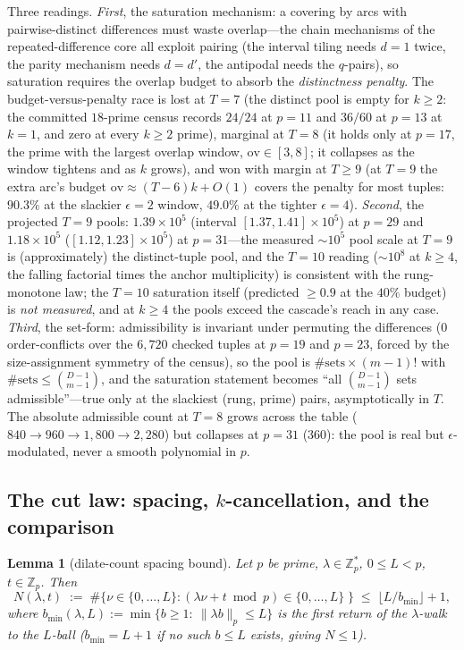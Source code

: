 \documentclass[11pt,a4paper]{article}
\numberwithin{equation}{section}
\theoremstyle{plain}
\newtheorem{lemma}[theorem]{Lemma}
\theoremstyle{definition}
\theoremstyle{remark}
\newcommand{\Z}{\mathbb{Z}}
\begin{document}
Three readings. \emph{First}, the saturation mechanism: a covering by
arcs with pairwise-distinct differences must waste overlap---the chain
mechanisms of the repeated-difference core all exploit pairing (the
interval tiling needs $d=1$ twice, the parity mechanism needs
$d=d'$, the antipodal needs the $q$-pairs), so saturation requires the
overlap budget to absorb the \emph{distinctness penalty}. The
budget-versus-penalty race is lost at $T=7$ (the distinct pool is empty
for $k\ge 2$: the committed $18$-prime census records $24/24$ at $p=11$
and $36/60$ at $p=13$ at $k=1$, and zero at every $k\ge2$ prime),
marginal at $T=8$ (it holds only at $p=17$, the prime with the largest
overlap window, $\mathrm{ov}\in[3,8]$; it collapses as the window
tightens and as $k$ grows), and won with margin at $T\ge 9$ (at $T=9$
the extra arc's budget $\mathrm{ov}\approx(T-6)k+O(1)$ covers the
penalty for most tuples: $90.3\%$ at the slackier $\epsilon=2$ window,
$49.0\%$ at the tighter $\epsilon=4$). \emph{Second}, the projected
$T=9$ pools: $1.39\times10^5$ (interval $[1.37,1.41]\times10^5$) at
$p=29$ and $1.18\times10^5$ ($[1.12,1.23]\times10^5$) at $p=31$---the
measured $\sim\!10^5$ pool scale at $T=9$ is (approximately) the
distinct-tuple pool, and the $T=10$ reading ($\sim\!10^8$ at $k\ge4$,
the falling factorial times the anchor multiplicity) is consistent with
the rung-monotone law; the $T=10$ saturation itself (predicted
$\ge 0.9$ at the $40\%$ budget) is \emph{not measured}, and at
$k\ge4$ the pools exceed the cascade's reach in any case.
\emph{Third}, the set-form: admissibility is invariant under permuting
the differences ($0$ order-conflicts over the $6{,}720$ checked tuples
at $p=19$ and $p=23$, forced by the size-assignment symmetry of the
census), so the pool is $\#\text{sets}\times(m-1)!$ with
$\#\text{sets}\le\binom{D-1}{m-1}$, and the saturation statement
becomes ``all $\binom{D-1}{m-1}$ sets admissible''---true only at the
slackiest (rung, prime) pairs, asymptotically in $T$. The absolute
admissible count at $T=8$ grows across the table
($840\to960\to1{,}800\to2{,}280$) but collapses at $p=31$ ($360$): the
pool is real but $\epsilon$-modulated, never a smooth polynomial in
$p$.

\subsection{The cut law: spacing, \texorpdfstring{$k$}{k}-cancellation, and the comparison}\label{sec:scale-cut}

\begin{lemma}[dilate-count spacing bound]\label{lem:spacing}
Let $p$ be prime, $\lambda\in\Z_p^*$, $0\le L<p$, $t\in\Z_p$. Then
\[
N(\lambda,t)\;:=\;\#\{\nu\in\{0,\dots,L\}:
(\lambda\nu+t\bmod p)\in\{0,\dots,L\}\;\}
\;\le\;\lfloor L/b_{\min}\rfloor+1,
\]
where $b_{\min}(\lambda,L):=\min\{b\ge 1:\ \|\lambda b\|_p\le L\}$ is
the first return of the $\lambda$-walk to the $L$-ball ($b_{\min}=L+1$
if no such $b\le L$ exists, giving $N\le 1$).
\end{lemma}
\end{document}
